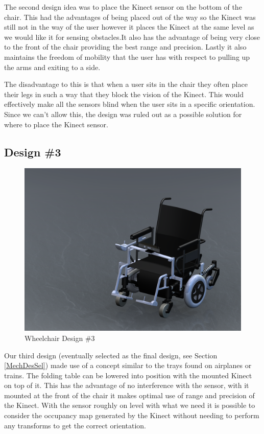 \documentclass[oneside,final,a4paper]{report}
\begin{document}
The second design idea was to place the Kinect sensor on the bottom of the chair.  This had the advantages of being placed out of the way so the Kinect was still not in the way of the user however it places the Kinect at the same level as we would like it for sensing obstacles.It also has the advantage of being very close to the front of the chair providing the best range and precision. Lastly it also maintains the freedom of mobility that the user has with respect to pulling up the arms and exiting to a side.

The disadvantage to this is that when a user sits in the chair they often place their legs in such a way that they block the vision of the Kinect. This would effectively make all the sensors blind when the user sits in a specific orientation. Since we can’t allow this, the design was ruled out as a possible solution for where to place the Kinect sensor.

\subsection{Design \#3}
\begin{figure}[hbt]
 \centering
 \includegraphics[scale=0.15]{WheelChair_Final}
 \caption{Wheelchair Design \#3}\label{fig:WheelChair_Final}
\end{figure}

Our third design (eventually selected as the final design, see Section \ref{MechDesSel}) made use of a concept similar to the trays found on airplanes or trains. The folding table can be lowered into position with the mounted Kinect on top of it. This has the advantage of no interference with the sensor, with it mounted at the front of the chair it makes optimal use of range and precision of the Kinect. With the sensor roughly on level with what we need it is possible to consider the occupancy map generated by the Kinect without needing to perform any transforms to get the correct orientation.
\end{document}
